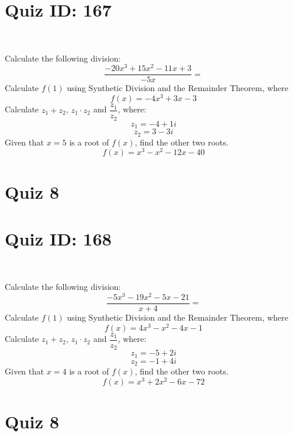 \documentclass{exam}
\begin{document}
\section*{Quiz ID: 167}
\vspace{0.5cm}\
\vspace{1cm}\
\begin{questions}
\question Calculate the following division:\[\dfrac{
-20x^3 + 15x^2 - 11x + 3}{
-5x}=\] \makeemptybox{\stretch{2}}
\question Calculate $f(1)$ using Synthetic Division and the Remainder Theorem, where\[f(x) = 
-4x^3 + 3x - 3\]
\newpage\question Calculate $z_1+z_2$, $z_1\cdot z_2$ and $\dfrac{z_1}{z_2}$, where:\[z_1=-4+1\mathit{i}\]\[z_2=3-3\mathit{i}\]
\question Given that $x=5$ is a root of $f(x)$, find the other two roots.\[f(x)=
x^3 - x^2 - 12x - 40\]\makeemptybox{\stretch{1}}
\end{questions}\newpage
\newpage
\section*{Quiz 8}
\section*{Quiz ID: 168}
\vspace{0.5cm}\
\vspace{1cm}\
\begin{questions}
\question Calculate the following division:\[\dfrac{
-5x^3 - 19x^2 - 5x - 21}{
x + 4}=\] 
\question Calculate $f(1)$ using Synthetic Division and the Remainder Theorem, where\[f(x) = 
4x^3 - x^2 - 4x - 1\]
\newpage\question Calculate $z_1+z_2$, $z_1\cdot z_2$ and $\dfrac{z_1}{z_2}$, where:\[z_1=-5+2\mathit{i}\]\[z_2=-1+4\mathit{i}\]\makeemptybox{\stretch{1}}
\question Given that $x=4$ is a root of $f(x)$, find the other two roots.\[f(x)=
x^3 + 2x^2 - 6x - 72\]\makeemptybox{\stretch{1}}
\end{questions}\newpage
\newpage
\section*{Quiz 8}
\end{document}
